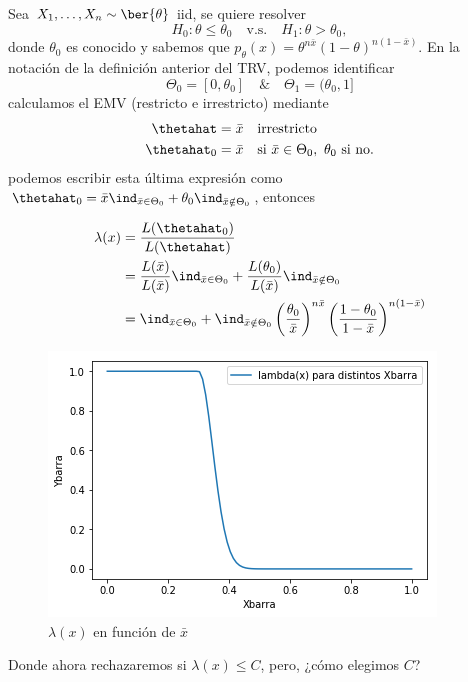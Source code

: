 \begin{example}
	Sea $X_1,\ldots,X_n\sim\ber{\theta}$ iid, se quiere resolver
	\begin{equation}
		H_0:\theta \leq\theta_0\quad \text{v.s.}\quad H_1:\theta >\theta_0,
	\end{equation}
donde $\theta_0$ es conocido y sabemos que $p_\theta(x) = \theta^{n\bar{x}}(1-\theta)^{n(1-\bar{x})}$. En la notación de la definición anterior del TRV, podemos identificar
\begin{equation}
	\Theta_0 = [0,\theta_0] \quad \& \quad \Theta_1 = (\theta_0, 1]
\end{equation}
calculamos el EMV (restricto e irrestricto) mediante 
\begin{align}
	\thetahat &= \bar{x}\quad \text{irrestricto}\\
	\thetahat_0 &= \bar{x} \quad \text{si } \bar{x}\in\Theta_0,\ \theta_0 \text{ si no.}
\end{align}
podemos escribir esta última expresión como $\thetahat_0 = \bar{x} \ind_{\bar{x}\in\Theta_0} + \theta_0\ind_{\bar{x}\notin\Theta_0}$, entonces

\begin{align}
	\lambda(x) &= \frac{L(\thetahat_0)}{L(\thetahat)}\\ 
				&= \frac{L(\bar{x})}{L(\bar{x})} \ind_{\bar{x}\in\Theta_0} + \frac{L(\theta_0)}{L(\bar{x})} \ind_{\bar{x}\notin\Theta_0} \\
				&= \ind_{\bar{x}\in\Theta_0} + \ind_{\bar{x}\notin\Theta_0} \left(\frac{\theta_0}{\bar{x}}\right)^{n\bar{x}}\left(\frac{1-\theta_0}{1-\bar{x}}\right)^{n(1-\bar{x})}
\end{align}
\begin{figure}[ht]
    \centering
    \includegraphics[scale=0.7]{img/LKratio.png}
    \caption{$\lambda(x)$ en función de $\bar{x}$}
    \label{fig:lk_ratio}
\end{figure}
Donde ahora rechazaremos si $\lambda(x)\leq C$, pero, ¿cómo elegimos $C$?


\end{example}
